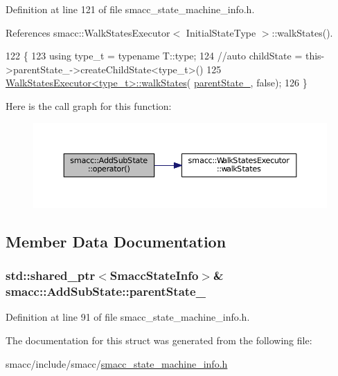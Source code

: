 Definition at line 121 of file smacc\+\_\+state\+\_\+machine\+\_\+info.\+h.



References smacc\+::\+Walk\+States\+Executor$<$ Initial\+State\+Type $>$\+::walk\+States().


\begin{DoxyCode}
122 \{
123     \textcolor{keyword}{using} type\_t = \textcolor{keyword}{typename} T::type;
124     \textcolor{comment}{//auto childState = this->parentState\_->createChildState<type\_t>()}
125     \hyperlink{structsmacc_1_1WalkStatesExecutor_a11a2b02eafb62ec298bcf5ffbb32848b}{WalkStatesExecutor<type\_t>::walkStates}(
      \hyperlink{structsmacc_1_1AddSubState_a24aaa4e3dbe9722ce100f24b73207cd6}{parentState\_}, \textcolor{keyword}{false});
126 \}
\end{DoxyCode}


Here is the call graph for this function\+:
\nopagebreak
\begin{figure}[H]
\begin{center}
\leavevmode
\includegraphics[width=350pt]{structsmacc_1_1AddSubState_a24b6d9a40ca08289e36562d26f1b863c_cgraph}
\end{center}
\end{figure}




\subsection{Member Data Documentation}
\subsubsection[{\texorpdfstring{parent\+State\+\_\+}{parentState_}}]{\setlength{\rightskip}{0pt plus 5cm}std\+::shared\+\_\+ptr$<${\bf Smacc\+State\+Info}$>$\& smacc\+::\+Add\+Sub\+State\+::parent\+State\+\_\+}\hypertarget{structsmacc_1_1AddSubState_a24aaa4e3dbe9722ce100f24b73207cd6}{}\label{structsmacc_1_1AddSubState_a24aaa4e3dbe9722ce100f24b73207cd6}


Definition at line 91 of file smacc\+\_\+state\+\_\+machine\+\_\+info.\+h.



The documentation for this struct was generated from the following file\+:\begin{DoxyCompactItemize}
\item 
smacc/include/smacc/\hyperlink{smacc__state__machine__info_8h}{smacc\+\_\+state\+\_\+machine\+\_\+info.\+h}\end{DoxyCompactItemize}
